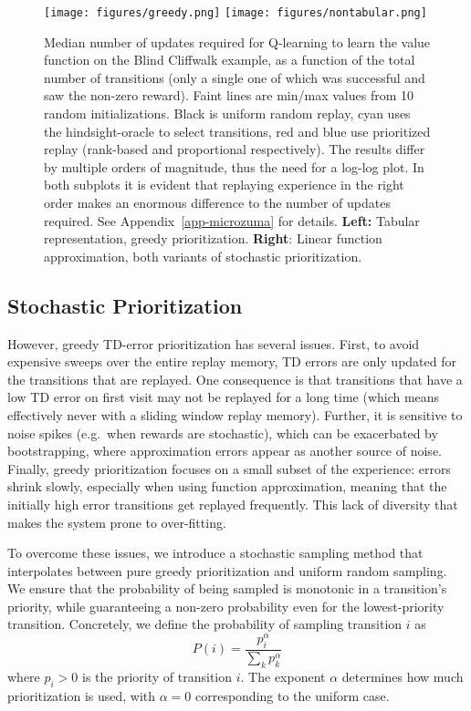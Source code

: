 \documentclass[a4paper]{article}
\begin{document}
\begin{figure}[tb]
\vspace{-0.5em}
\centerline{
\texttt{[image: figures/greedy.png]}
\hspace{0.05\textwidth}
\texttt{[image: figures/nontabular.png]}
}
\vspace{-0.5em}
\caption{
\label{fig-baseline-oracle}
Median number of updates required for Q-learning to learn the value function on the Blind Cliffwalk example, as a function of the total number of transitions (only a single one of which was successful and saw the non-zero reward). Faint lines are min/max values from 10 random initializations.
Black is uniform random replay, cyan uses the hindsight-oracle to select transitions, red and blue use prioritized replay (rank-based and proportional respectively).
The results differ by multiple orders of magnitude, thus the need for a log-log plot.
In both subplots it is evident that replaying experience in the right order makes an enormous difference to the number of updates required. See Appendix~\ref{app-microzuma} for details.
{\bf Left:} Tabular representation, greedy prioritization. {\bf Right}: Linear function approximation, both variants of stochastic prioritization.
\vspace{-1em}
}
\end{figure}


\subsection{Stochastic Prioritization}


However, greedy TD-error prioritization has several issues.
First, to avoid expensive sweeps over the entire replay memory, TD errors are only updated for the transitions that are replayed. One consequence is that transitions that have a low TD error on first visit may not be replayed for a long time 
(which means effectively never with a sliding window replay memory).
Further, it is sensitive to noise spikes (e.g.\ when rewards are stochastic), 
which can be exacerbated by bootstrapping, where approximation errors appear as another source of noise.
Finally, greedy prioritization focuses on a small subset of the experience: errors shrink slowly, especially when using function approximation, meaning that the initially high error transitions get replayed frequently. This lack of diversity that makes the system prone to over-fitting.

To overcome these issues, we introduce a stochastic sampling method that
interpolates between pure greedy prioritization and uniform random sampling. We ensure that the probability of being sampled is monotonic in a transition's priority, 
while guaranteeing a non-zero probability even for the lowest-priority transition.
Concretely, we define the probability of sampling transition $i$ as
\begin{equation}
\label{eq-distr}
P(i) = \frac{p_i^{\alpha}}{\sum_k p_k^{\alpha}}
\end{equation}
where $p_i > 0$ is the priority of transition $i$.
The exponent $\alpha$ determines how much prioritization is used, with $\alpha=0$ corresponding to the uniform case.
\end{document}
